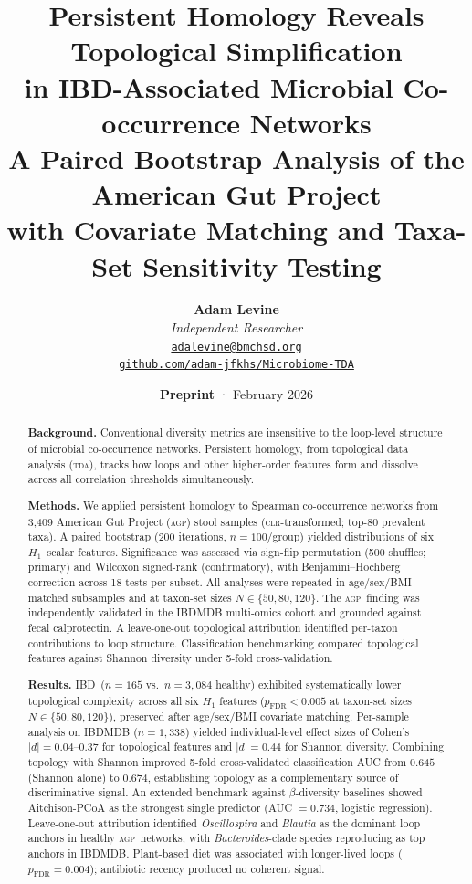 \documentclass[11pt, a4paper]{article}
\title{%
  \vspace{-10mm}
  {\LARGE\bfseries\color{darkblue}
    Persistent Homology Reveals Topological Simplification\\[4pt]
    in IBD-Associated Microbial Co-occurrence Networks}\\[8pt]
  {\large\normalfont\color{gray}
    A Paired Bootstrap Analysis of the American Gut Project\\
    with Covariate Matching and Taxa-Set Sensitivity Testing}
}
\author{%
  \textbf{Adam Levine}\\[3pt]
  \small\textit{Independent Researcher}\\[2pt]
  \small\texttt{\href{mailto:adalevine@bmchsd.org}{adalevine@bmchsd.org}}\\[4pt]
  \small\texttt{\href{https://github.com/adam-jfkhs/Microbiome-TDA}{github.com/adam-jfkhs/Microbiome-TDA}}
}
\date{%
  \small\textbf{Preprint} · February 2026
}
\newcommand{\Hone}{\ensuremath{H_1}}
\newcommand{\agp}{\textsc{agp}}
\newcommand{\clr}{\textsc{clr}}
\newcommand{\tda}{\textsc{tda}}
\newcommand{\Ibd}{IBD}
\begin{document}

\maketitle
\thispagestyle{plain}

\begin{abstract}
\noindent\textbf{Background.}
Conventional diversity metrics are insensitive to the loop-level
structure of microbial co-occurrence networks.
Persistent homology, from topological data analysis (\tda), tracks how
loops and other higher-order features form and dissolve across all
correlation thresholds simultaneously.

\noindent\textbf{Methods.}
We applied persistent homology to Spearman co-occurrence networks from
3,409 American Gut Project (\agp) stool samples (\clr-transformed;
top-80 prevalent taxa).
A paired bootstrap (200 iterations, $n = 100$/group) yielded distributions
of six \Hone\ scalar features.
Significance was assessed via sign-flip permutation (500 shuffles; primary)
and Wilcoxon signed-rank (confirmatory), with Benjamini--Hochberg correction
across 18 tests per subset.
All analyses were repeated in age/sex/BMI-matched subsamples and at
taxon-set sizes $N \in \{50, 80, 120\}$.
The \agp\ finding was independently validated in the IBDMDB multi-omics
cohort and grounded against fecal calprotectin.
A leave-one-out topological attribution identified per-taxon contributions
to loop structure.
Classification benchmarking compared topological features against Shannon
diversity under 5-fold cross-validation.

\noindent\textbf{Results.}
\Ibd\ ($n = 165$ vs.\ $n = 3{,}084$ healthy) exhibited systematically lower
topological complexity across all six $H_1$ features
($p_{\text{FDR}} < 0.005$ at taxon-set sizes $N \in \{50, 80, 120\}$),
preserved after age/sex/BMI covariate matching.
Per-sample analysis on IBDMDB ($n = 1{,}338$) yielded individual-level
effect sizes of Cohen's $|d| = 0.04$--$0.37$ for topological features
and $|d| = 0.44$ for Shannon diversity.
Combining topology with Shannon improved 5-fold cross-validated
classification AUC from $0.645$ (Shannon alone) to $0.674$,
establishing topology as a complementary source of discriminative signal.
An extended benchmark against $\beta$-diversity baselines showed
Aitchison-PCoA as the strongest single predictor
(AUC $= 0.734$, logistic regression).
Leave-one-out attribution identified \textit{Oscillospira} and
\textit{Blautia} as the dominant loop anchors in healthy \agp\ networks,
with \textit{Bacteroides}-clade species reproducing as top anchors in
IBDMDB.
Plant-based diet was associated with longer-lived loops
($p_{\text{FDR}} = 0.004$); antibiotic recency produced no coherent signal.


\end{abstract}
\end{document}
